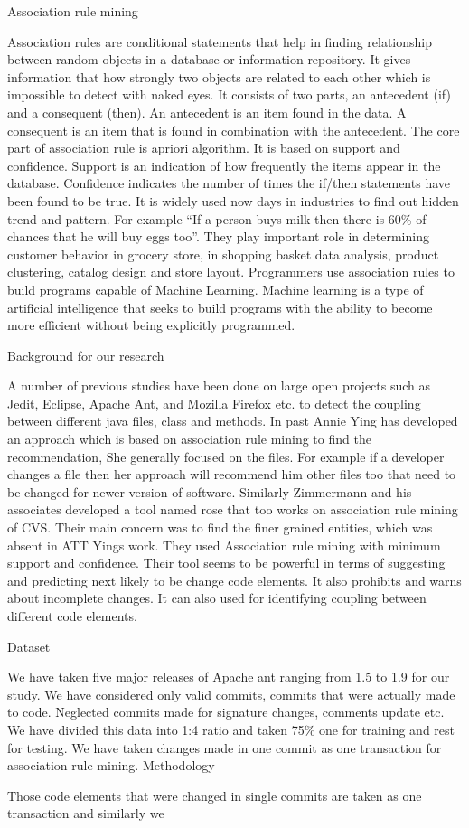 Association rule mining

Association rules are conditional statements that help in finding relationship between random objects in a database or information repository. It gives information that how strongly two objects are related to each other which is impossible to detect with naked eyes.
It consists of two parts, an antecedent (if) and a consequent (then).  An antecedent is an item found in the data. A consequent is an item that is found in combination with the antecedent.
The core part of association rule is apriori algorithm. It is based on support and confidence. Support is an indication of how frequently the items appear in the database. Confidence indicates the number of times the if/then statements have been found to be true.
It is widely used now days in industries to find out hidden trend and pattern. 
For example “If a person buys milk then there is 60\% of chances that he will buy eggs too”. They play important role in determining customer behavior in grocery store, in shopping basket data analysis, product clustering, catalog design and store layout. Programmers use association rules to build programs capable of Machine Learning. Machine learning is a type of artificial intelligence that seeks to build programs with the ability to become more efficient without being explicitly programmed.

Background for our research

A number of previous studies have been done on large open projects such as Jedit, Eclipse, Apache Ant, and Mozilla Firefox etc. to detect the coupling between different java files, class and methods. In past Annie Ying has developed an approach which is based on association rule mining to find the recommendation, She generally focused on the files. For example if a developer changes a file then her approach will recommend him other files too that need to be changed for newer version of software. Similarly Zimmermann and his associates developed a tool named rose that too works on association rule mining of CVS. Their main concern was to find the finer grained entities, which was absent in ATT Yings work. They used Association rule mining with minimum support and confidence. Their tool seems to be powerful in terms of suggesting and predicting next likely to be change code elements. It also prohibits and warns about incomplete changes. It can also used for identifying coupling between different code elements.

Dataset

We have taken five major releases of Apache ant ranging from 1.5 to 1.9 for our study. We have considered only valid commits, commits that were actually made to code. Neglected commits made for signature changes, comments update etc. We have divided this data into 1:4 ratio and taken 75\% one for training and rest for testing. We have taken changes made in one commit as one transaction for association rule mining.
Methodology

Those code elements that were changed in single commits are taken as one transaction and similarly we 



